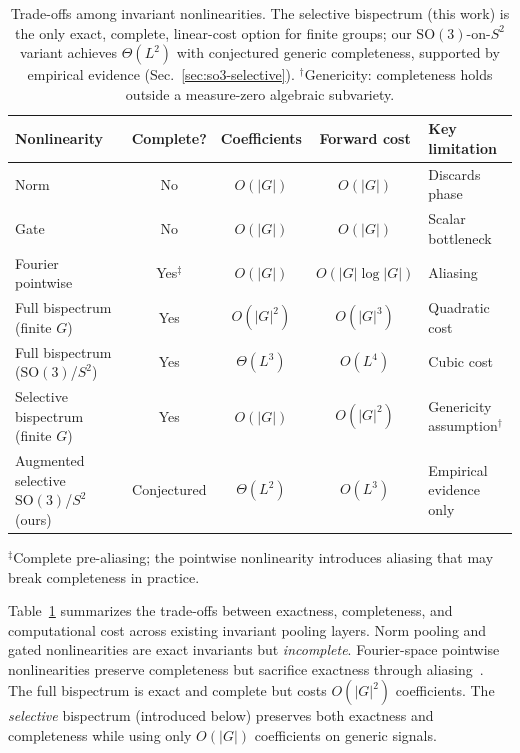 \documentclass{article}
\theoremstyle{definition}
\theoremstyle{remark}
\newcommand{\SO}{\mathrm{SO}}
\theoremstyle{definition}
\begin{document}
\begin{table}[t]
  \caption{Trade-offs among invariant nonlinearities. The selective
    bispectrum (this work) is the only exact, complete, linear-cost
    option for finite groups; our $\SO(3)$-on-$S^2$ variant achieves
    $\Theta(L^2)$ with conjectured generic completeness, supported by
    empirical evidence (Sec.~\ref{sec:so3-selective}).
    $^\dagger$Genericity: completeness holds outside a measure-zero
    algebraic subvariety.}
  \label{tab:nonlinearity-comparison}
  \centering
  \small
  \setlength{\tabcolsep}{2.5pt}
  \begin{tabular}{lcccl}
    \toprule
    Nonlinearity & Complete? & Coefficients & Forward cost & Key limitation \\
    \midrule
    Norm              & No              & $O(|G|)$   & $O(|G|)$          & Discards phase \\
    Gate              & No              & $O(|G|)$   & $O(|G|)$          & Scalar bottleneck \\
    Fourier pointwise & Yes$^\ddagger$  & $O(|G|)$   & $O(|G| \log |G|)$ & Aliasing \\
    Full bispectrum (finite $G$)      & Yes & $O(|G|^2)$   & $O(|G|^3)$ & Quadratic cost \\
    Full bispectrum ($\SO(3)$/$S^2$)  & Yes & $\Theta(L^3)$ & $O(L^4)$  & Cubic cost \\
    \midrule
    Selective bispectrum (finite $G$) & Yes       & $O(|G|)$      & $O(|G|^2)$ & Genericity assumption$^\dagger$ \\
    Augmented selective $\SO(3)$/$S^2$ (ours) & Conjectured & $\Theta(L^2)$ & $O(L^3)$   & Empirical evidence only \\
    \bottomrule
  \end{tabular}

  \vspace{0.3em}
  {\small $^\ddagger$Complete pre-aliasing; the pointwise nonlinearity introduces aliasing that may break completeness in practice.}
\end{table}

Table~\ref{tab:nonlinearity-comparison} summarizes the trade-offs between
exactness, completeness, and computational cost across existing invariant
pooling layers. Norm pooling and gated nonlinearities are exact
invariants but \emph{incomplete}. Fourier-space pointwise
nonlinearities preserve completeness but sacrifice exactness through
\mbox{aliasing~\citep{weiler2019general}}. The full bispectrum is exact and
complete but costs $O(|G|^2)$ coefficients. The \emph{selective}
bispectrum (introduced below) preserves both exactness and completeness
while using only $O(|G|)$ coefficients on generic signals.
\end{document}
